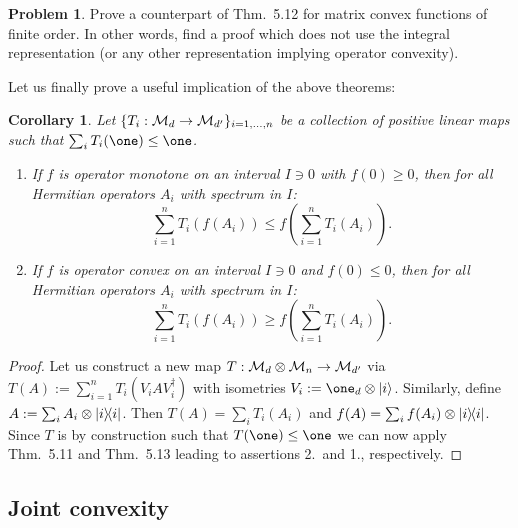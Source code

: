 \documentclass[11pt,a4paper]{article}
\theoremstyle{plain}
\newtheorem{corollary}{Corollary}[section]
\theoremstyle{definition}
\newtheorem{problem}{Problem} %
\theoremstyle{remark}
\numberwithin{equation}{section}
\begin{document}
\begin{problem}
Prove a counterpart of Thm.~5.12 for matrix convex functions of finite order. In other
words, find a proof which does not use the integral representation (or any other
representation implying operator convexity).
\end{problem}

Let us finally prove a useful implication of the above theorems:

\begin{corollary}
    Let $\{T_i:\mathcal{M}_d\to \mathcal{M}_{d'}\}_{i=1,\dots,n}$ be a collection of positive linear maps
    such that $\sum_i T_i(\one)\le \one$.
    \begin{enumerate}
        \item If $f$ is operator monotone on an interval $I\ni 0$ with $f(0)\ge 0$, then for
              all Hermitian operators $A_i$ with spectrum in $I$:
              \begin{equation}\label{eq:5.37}
                  \sum_{i=1}^n T_i(f(A_i))
                  \le
                  f\!\left(\sum_{i=1}^n T_i(A_i)\right).
              \end{equation}
        \item If $f$ is operator convex on an interval $I\ni 0$ and $f(0)\le 0$, then for all
              Hermitian operators $A_i$ with spectrum in $I$:
              \begin{equation}\label{eq:5.38}
                  \sum_{i=1}^n T_i(f(A_i))
                  \ge
                  f\!\left(\sum_{i=1}^n T_i(A_i)\right).
              \end{equation}
    \end{enumerate}
\end{corollary}

\begin{proof}
    Let us construct a new map $T:\mathcal{M}_d\otimes \mathcal{M}_n \to \mathcal{M}_{d'}$ via
    $T(A):=\sum_{i=1}^n T_i(V_i A V_i^\dagger)$ with isometries
    $V_i:=\one_d \otimes \ket{i}$. Similarly, define
    $A:=\sum_i A_i\otimes |i\rangle\!\langle i|$. Then $T(A)=\sum_i T_i(A_i)$ and
    $f(A)=\sum_i f(A_i)\otimes |i\rangle\!\langle i|$. Since $T$ is by construction such that
    $T(\one)\le \one$ we can now apply Thm.~5.11 and Thm.~5.13 leading to assertions 2.\
    and 1., respectively.
\end{proof}

\subsection{Joint convexity}
\end{document}
